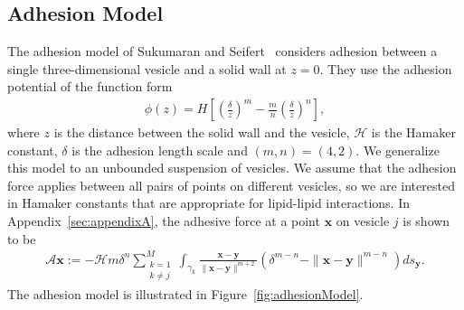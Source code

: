 \documentclass[prf,superscriptaddress,showpacs]{revtex4-1}
\renewcommand{\AA}{\mathcal{A}}
\newcommand{\xx}{\mathbf{x}}
\newcommand{\yy}{\mathbf{y}}
\begin{document}
\subsection{Adhesion Model}
The adhesion model of Sukumaran and Seifert~\cite{suk-sei2001} considers
adhesion between a single three-dimensional vesicle and a solid wall at
$z=0$.  They use the adhesion potential of the function form
\begin{align}
\label{eq:adhesion_potential}
  \phi(z) = H \left[ 
    \left(\frac{\delta}{z}\right)^m - \frac{m}{n} \left(\frac{\delta}{z}\right)^n \right],
\end{align}
where $z$ is the distance between the solid wall and the vesicle,
$\mathcal{H}$ is the Hamaker constant, $\delta$ is the adhesion length
scale and $(m,n) = (4,2)$.  We generalize this model to an unbounded
suspension of vesicles.  We assume that the adhesion force applies
between all pairs of points on different vesicles, so we are interested
in Hamaker constants that are appropriate for lipid-lipid interactions.
In Appendix~\ref{sec:appendixA}, the adhesive force at a point $\xx$ on
vesicle $j$ is shown to be
\begin{align}
  \AA\xx:=-\mathcal{H} m \delta^{n}\sum_{\substack{k=1 \\ k \neq j}}^M 
  \int_{\gamma_k} \frac{\xx - \yy}{\|\xx - \yy\|^{m+2}} 
  \left(\delta^{m-n} - \|\xx - \yy\|^{m-n} \right) ds_\yy.
  \label{eqn:adhesionForce}
\end{align}
The adhesion model is illustrated in Figure~\ref{fig:adhesionModel}.
\end{document}

